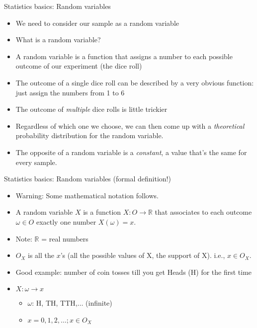\begin{frame}{Statistics basics: Random variables}

\begin{itemize}
\itemsep1pt\parskip0pt
\item
  We need to consider our sample as a random variable
\item
  What is a random variable?
\item
  A random variable is a function that assigns a number to each possible
  outcome of our experiment (the dice roll)
\item
  The outcome of a single dice roll can be described by a very obvious
  function: just assign the numbers from 1 to 6
\item
  The outcome of \emph{multiple} dice rolls is little trickier
\item
  Regardless of which one we choose, we can then come up with a
  \emph{theoretical} probability distribution for the random variable.
\item
  The opposite of a random variable is a \emph{constant}, a value that's
  the same for every sample.
\end{itemize}

\end{frame}

\begin{frame}{Statistics basics: Random variables (formal definition!)}

\begin{itemize}
\item
  Warning: Some mathematical notation follows.
\item
  A random variable \(X\) is a function \(X : O \rightarrow \mathbb{R}\)
  that associates to each outcome \(\omega \in O\) exactly one number
  \(X(\omega) = x\).
\item
  Note: \(\mathbb{R}\) = real numbers
\item
  \(O_X\) is all the \(x\)'s (all the possible values of X, the support
  of X). i.e., \(x \in O_X\).
\item
  Good example: number of coin tosses till you get Heads (H) for the
  first time
\item
  \(X: \omega \rightarrow x\)

  \begin{itemize}
  \itemsep1pt\parskip0pt
  \item
    \(\omega\): H, TH, TTH,\(\dots\) (infinite)
  \item
    \(x=0,1,2,\dots; x \in O_X\)
  \end{itemize}
\end{itemize}

\end{frame}

